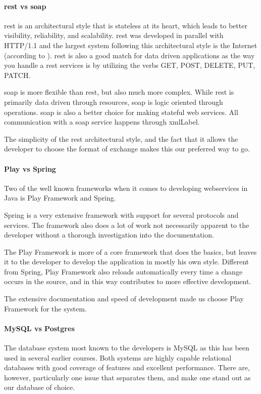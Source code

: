 \documentclass[11pt]{book}
\begin{document}
\paragraph{\gls{rest} vs \gls{soap}}
\gls{rest} \cite{rest} is an architectural style that is stateless at its heart, which leads to better visibility, reliability, and scalability. \gls{rest} was developed in parallel with HTTP/1.1 and the largest system following this architectural style is the Internet (according to \cite{wikipedia:rest}). \gls{rest} is also a good match for data driven applications as the way you handle a \gls{rest} services is by utilizing the verbs GET, POST, DELETE, PUT, PATCH.

\gls{soap} is more flexible than \gls{rest}, but also much more complex. While \gls{rest} is primarily data driven through resources, \gls{soap} is logic oriented through operations. \gls{soap} is also a better choice for making stateful web services. All communication with a \gls{soap} service happens through \gls{xmlLabel}.

The simplicity of the \gls{rest} architectural style, and the fact that it allows the developer to choose the format of exchange makes this our preferred way to go.

\paragraph{Play vs Spring}
Two of the well known frameworks when it comes to developing webservices in Java is Play Framework and Spring. %

Spring is a very extensive framework with support for several protocols and services. The framework also does a lot of work not necessarily apparent to the developer without a thorough investigation into the documentation.

The Play Framework is more of a core framework that does the basics, but leaves it to the developer to develop the application in mostly his own style. Different from Spring, Play Framework also reloads automatically every time a change occurs in the source, and in this way contributes to more effective development.

The extensive documentation and speed of development made us choose Play Framework for the system.

\paragraph{MySQL vs Postgres}
The database system most known to the developers is MySQL as this has been used in several earlier courses. Both systems are highly capable relational databases with good coverage of features and excellent performance. There are, however, particularly one issue that separates them, and make one stand out as our database of choice.
\end{document}
